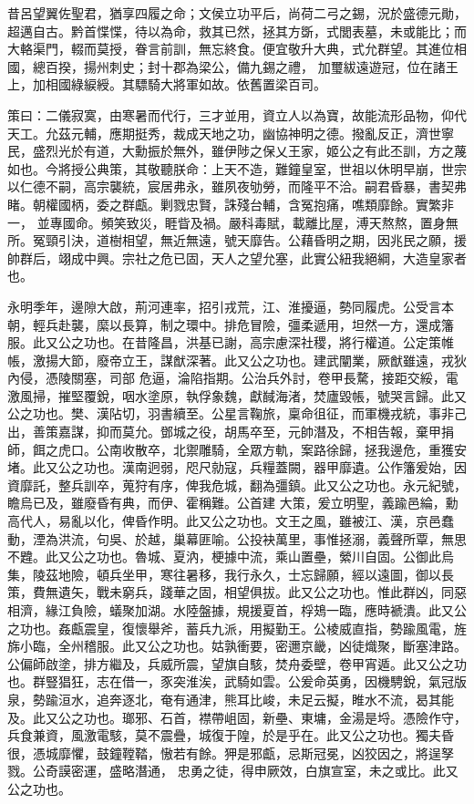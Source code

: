 \begin{pinyinscope}
 昔呂望翼佐聖君，猶享四履之命；文侯立功平后，尚荷二弓之錫，況於盛德元勛，超邁自古。黔首惵惵，待以為命，救其已然，拯其方斲，式閭表墓，未或能比；而大輅渠門，輟而莫授，眷言前訓，無忘終食。便宜敬升大典，式允群望。其進位相國，總百揆，揚州刺史；封十郡為梁公，備九錫之禮，
 加璽紱遠遊冠，位在諸王上，加相國綠綟綬。其驃騎大將軍如故。依舊置梁百司。



 策曰：二儀寂寞，由寒暑而代行，三才並用，資立人以為寶，故能流形品物，仰代天工。允茲元輔，應期挺秀，裁成天地之功，幽協神明之德。撥亂反正，濟世寧民，盛烈光於有道，大勳振於無外，雖伊陟之保乂王家，姬公之有此丕訓，方之蔑如也。今將授公典策，其敬聽朕命：上天不造，難鐘皇室，世祖以休明早崩，世宗以仁德不嗣，高宗襲統，宸居弗永，雖夙夜劬勞，而隆平不洽。嗣君昏暴，書契弗睹。朝權國柄，委之群甗。剿戮忠賢，誅殘台輔，含冤抱痛，噍類靡餘。實繁非一，
 並專國命。頻笑致災，睚眥及禍。嚴科毒賦，載離比屋，溥天熬熬，置身無所。冤頸引決，道樹相望，無近無遠，號天靡告。公藉昏明之期，因兆民之願，援帥群后，翊成中興。宗社之危已固，天人之望允塞，此實公紐我絕綱，大造皇家者也。



 永明季年，邊隙大啟，荊河連率，招引戎荒，江、淮擾逼，勢同履虎。公受言本朝，輕兵赴襲，縻以長算，制之環中。排危冒險，彊柔遞用，坦然一方，還成籓服。此又公之功也。在昔隆昌，洪基已謝，高宗慮深社稷，將行權道。公定策帷帳，激揚大節，廢帝立王，謀猷深著。此又公之功也。建武闡業，厥猷雖遠，戎狄內侵，憑陵關塞，司部
 危逼，淪陷指期。公治兵外討，卷甲長騖，接距交綏，電激風掃，摧堅覆銳，咽水塗原，執俘象魏，獻馘海渚，焚廬毀帳，號哭言歸。此又公之功也。樊、漢阽切，羽書續至。公星言鞠旅，稟命徂征，而軍機戎統，事非己出，善策嘉謀，抑而莫允。鄧城之役，胡馬卒至，元帥潛及，不相告報，棄甲捐師，餌之虎口。公南收散卒，北禦雕騎，全眾方軌，案路徐歸，拯我邊危，重獲安堵。此又公之功也。漢南迥弱，咫尺勍寇，兵糧蓋闕，器甲靡遺。公作籓爰始，因資靡託，整兵訓卒，蒐狩有序，俾我危城，翻為彊鎮。此又公之功也。永元紀號，瞻烏已及，雖廢昏有典，而伊、霍稱難。公首建
 大策，爰立明聖，義踰邑綸，勳高代人，易亂以化，俾昏作明。此又公之功也。文王之風，雖被江、漢，京邑蠢動，湮為洪流，句吳、於越，巢幕匪喻。公投袂萬里，事惟拯溺，義聲所覃，無思不韙。此又公之功也。魯城、夏汭，梗據中流，乘山置壘，縈川自固。公御此烏集，陵茲地險，頓兵坐甲，寒往暑移，我行永久，士忘歸願，經以遠圖，御以長策，費無遺矢，戰未窮兵，踐華之固，相望俱拔。此又公之功也。惟此群凶，同惡相濟，緣江負險，蟻聚加湖。水陸盤據，規援夏首，桴鳷一臨，應時褫潰。此又公之功也。姦甗震皇，復懷舉斧，蓄兵九派，用擬勤王。公棱威直指，勢踰風電，旌
 旆小臨，全州稽服。此又公之功也。姑孰衝要，密邇京畿，凶徒熾聚，斷塞津路。公偏師啟塗，排方繼及，兵威所震，望旗自駭，焚舟委壁，卷甲宵遁。此又公之功也。群豎猖狂，志在借一，豕突淮涘，武騎如雲。公爰命英勇，因機騁銳，氣冠版泉，勢踰洹水，追奔逐北，奄有通津，熊耳比峻，未足云擬，睢水不流，曷其能及。此又公之功也。瑯邪、石首，襟帶岨固，新壘、東墉，金湯是埒。憑險作守，兵食兼資，風激電駭，莫不震疊，城復于隍，於是乎在。此又公之功也。獨夫昏很，憑城靡懼，鼓鐘鞺鞜，慠若有餘。狎是邪甗，忌斯冠冕，凶狡因之，將逞孥戮。公奇謨密運，盛略潛通，
 忠勇之徒，得申厥效，白旗宣室，未之或比。此又公之功也。




\end{pinyinscope}
